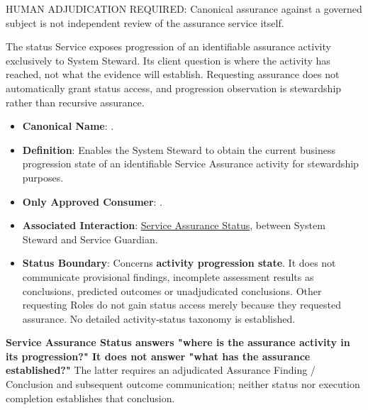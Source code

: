 HUMAN ADJUDICATION REQUIRED: Canonical assurance against a governed subject is not independent review of the assurance service itself.



The status Service exposes progression of an identifiable assurance activity exclusively to System Steward. Its client question is where the activity has reached, not what the evidence will establish. Requesting assurance does not automatically grant status access, and progression observation is stewardship rather than recursive assurance.



\begin{itemize}

\item
\textbf{Canonical Name}: \texttt{}.



\item
\textbf{Definition}: Enables the System Steward to obtain the current business progression state of an identifiable Service Assurance activity for stewardship purposes.



\item
\textbf{Only Approved Consumer}: \texttt{}.



\item
\textbf{Associated Interaction}: \href{https://github.com/fhirfactory/harmonia/blob/98410db60155198a75f74c79d98060070209faa1/docs/markdown/03-business-architecture/collaborations-interactions/interactions.md\#service-assurance-status}{Service Assurance Status}, between System Steward and Service Guardian.



\item
\textbf{Status Boundary}: Concerns \textbf{activity progression state}. It does not communicate provisional findings, incomplete assessment results as conclusions, predicted outcomes or unadjudicated conclusions. Other requesting Roles do not gain status access merely because they requested assurance. No detailed activity-status taxonomy is established.



\end{itemize}

\textbf{Service Assurance Status answers "where is the assurance activity in its progression?" It does not answer "what has the assurance established?"} The latter requires an adjudicated Assurance Finding /\allowbreak{} Conclusion and subsequent outcome communication; neither status nor execution completion establishes that conclusion.


